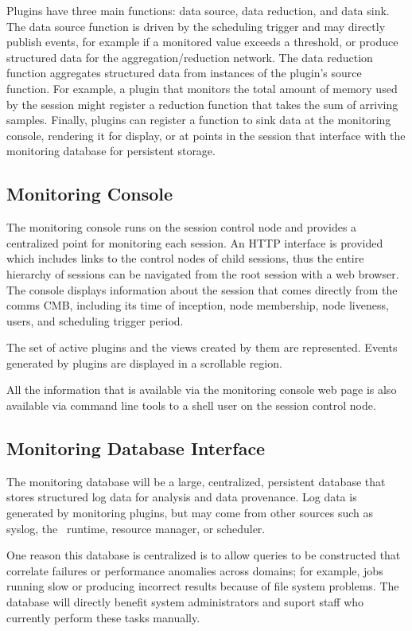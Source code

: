 Plugins have three main functions: data source, data reduction,
and data sink.  The data source function is driven by the scheduling
trigger and may directly publish events, for example if a monitored
value exceeds a threshold, or produce structured data for the
aggregation/reduction network.
The data reduction function aggregates structured data from instances
of the plugin's source function.
For example, a plugin that monitors the total amount of memory used
by the session might register a reduction function that takes the sum of
arriving samples.
Finally, plugins can register a function to sink data at the monitoring
console, rendering it for display, or at points in the session that interface
with the monitoring database for persistent storage.

\subsection{Monitoring Console}

The monitoring console runs on the session control node and provides
a centralized point for monitoring each session.
An HTTP interface is provided which includes links to the control nodes
of child sessions, thus the entire hierarchy of sessions can be navigated
from the root session with a web browser.
The console displays information about the session that comes directly
from the comms CMB, including its time of inception, node membership,
node liveness, users, and scheduling trigger period.

The set of active plugins and the views created by them are represented.
Events generated by plugins are displayed in a scrollable region.

All the information that is available via the monitoring console web page
is also available via command line tools to a shell user on the session
control node.

\subsection{Monitoring Database Interface}

The monitoring database will be a large, centralized, persistent database
that stores structured log data for analysis and data provenance.
Log data is generated by monitoring plugins, but may come from other sources
such as syslog, the \ngrm\ runtime, resource manager, or scheduler.

One reason this database is centralized is to allow queries
to be constructed that correlate failures or performance anomalies
across domains; for example, jobs running slow or producing incorrect
results because of file system problems.  The database will directly
benefit system administrators and suport staff who currently perform
these tasks manually.

